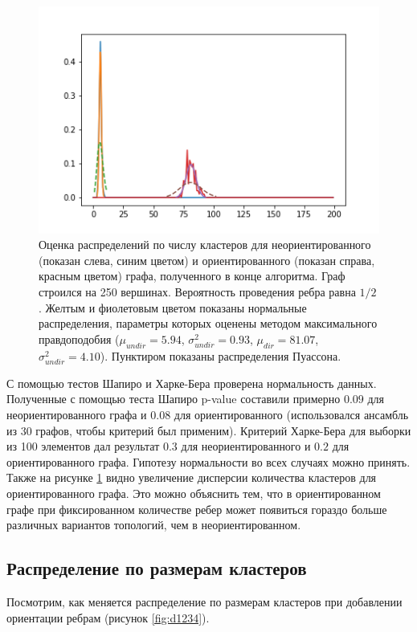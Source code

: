 \begin{figure}[h!]
	\centering
	\includegraphics[width=\textwidth]{pics/distribution.png}
	\caption{Оценка распределений по числу кластеров для неориентированного (показан слева, синим цветом) и ориентированного (показан справа, красным цветом) графа, полученного в конце алгоритма. Граф строился на 250 вершинах. Вероятность проведения ребра равна $1/2$. Желтым и фиолетовым цветом показаны нормальные распределения, параметры которых оценены методом максимального правдоподобия ($\mu_{undir}=5.94$, $\sigma^2_{undir}=0.93$, $\mu_{dir}=81.07$, $\sigma^2_{undir}=4.10$). Пунктиром показаны распределения Пуассона.} 
	\label{fig:distribution}
\end{figure}

С помощью тестов Шапиро и Харке-Бера проверена нормальность данных. Полученные с помощью теста Шапиро p-value составили примерно $0.09$ для неориентированного графа и $0.08$ для ориентированного (использовался ансамбль из 30 графов, чтобы критерий был применим). Критерий Харке-Бера для выборки из 100 элементов дал результат $0.3$ для неориентированного и $0.2$ для ориентированного графа. Гипотезу нормальности во всех случаях можно принять.\\

Также на рисунке \ref{fig:distribution} видно увеличение дисперсии количества кластеров для ориентированного графа. Это можно объяснить тем, что в ориентированном графе при фиксированном количестве ребер может появиться гораздо больше различных вариантов топологий, чем в неориентированном.\\

\subsection{Распределение по размерам кластеров}
Посмотрим, как меняется распределение по размерам кластеров при добавлении ориентации ребрам (рисунок \ref{fig:d1234}). 

